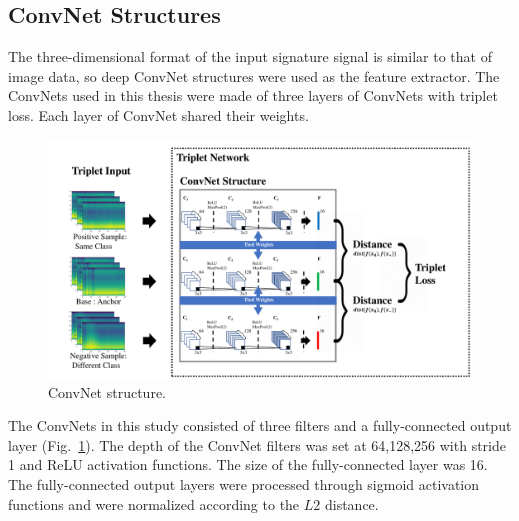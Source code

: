 \subsection{ConvNet Structures}
The three-dimensional format of the input signature signal is similar to that of image data, so deep ConvNet structures were used as the feature extractor. The ConvNets used in this thesis were made of three layers of ConvNets with triplet loss. Each layer of ConvNet shared their weights. 
\begin{figure}[!ht]
    \includegraphics[width=\textwidth]
        {fig_convnet_v1.pdf}
    \caption{ConvNet structure.} \label{fig3}
\end{figure}
The ConvNets in this study consisted of three filters and a fully-connected output layer (Fig.~\ref{fig3}). The depth of the ConvNet filters was set at 64,128,256 with stride 1 and ReLU activation functions. The size of the fully-connected layer was 16. The fully-connected output layers were processed through sigmoid activation functions and were normalized according to the $L2$ distance.

